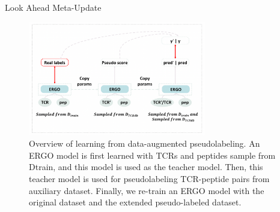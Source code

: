 \documentclass[aspectratio=1610,xcolor={dvipsnames},hyperref={colorlinks,unicode,linkcolor=violet,anchorcolor=blueviolet,citecolor=YellowOrange,filecolor=black,urlcolor=Aquamarine}]{beamer}
\begin{document}
\begin{frame}[label={sec:org2213fc4}]{Look Ahead Meta-Update}
\begin{figure}[htbp]
\centering
\includegraphics[height=5cm]{./pm.png}
\caption{\label{fig:org9dd8916}Overview of learning from data-augmented pseudolabeling. An ERGO model is first learned with TCRs and peptides sample from Dtrain, and this model is used as the teacher model. Then, this teacher model is used for pseudolabeling TCR-peptide pairs from auxiliary dataset. Finally, we re-train an ERGO model with the original dataset and the extended pseudo-labeled dataset.}
\end{figure}
\end{frame}
\end{document}
